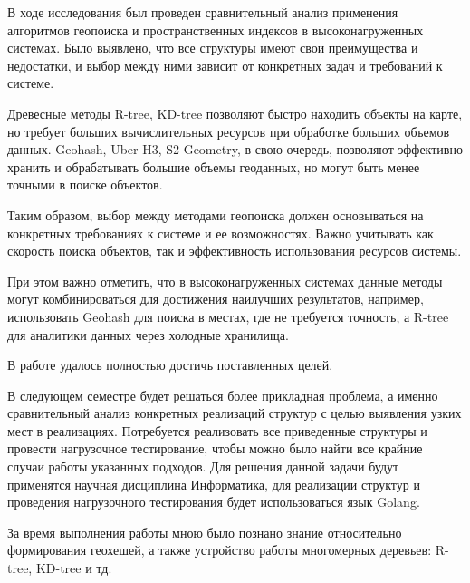 \Conclusion

В ходе исследования был проведен сравнительный анализ применения алгоритмов геопоиска и пространственных индексов в высоконагруженных системах. Было выявлено, что все структуры имеют свои преимущества и недостатки, и выбор между ними зависит от конкретных задач и требований к системе.

Древесные методы R-tree, KD-tree позволяют быстро находить объекты на карте, но требует больших вычислительных ресурсов при обработке больших объемов данных. Geohash, Uber H3, S2 Geometry, в свою очередь, позволяют эффективно хранить и обрабатывать большие объемы геоданных, но могут быть менее точными в поиске объектов.

Таким образом, выбор между методами геопоиска должен основываться на конкретных требованиях к системе и ее возможностях. Важно учитывать как скорость поиска объектов, так и эффективность использования ресурсов системы.

При этом важно отметить, что в высоконагруженных системах данные методы могут комбинироваться для достижения наилучших результатов, например, использовать Geohash для поиска в местах, где не требуется точность, а R-tree для аналитики данных через холодные хранилища.

В работе удалось полностью достичь поставленных целей.

В следующем семестре будет решаться более прикладная проблема, а именно сравнительный анализ конкретных реализаций структур с целью выявления узких мест в реализациях. Потребуется реализовать все приведенные структуры и провести нагрузочное тестирование, чтобы можно было найти все крайние случаи работы указанных подходов. Для решения данной задачи будут применятся научная дисциплина Информатика, для реализации структур и проведения нагрузочного тестирования будет использоваться язык Golang.

За время выполнения работы мною было познано знание относительно формирования геохешей, а также устройство работы многомерных деревьев: R-tree, KD-tree и тд.
